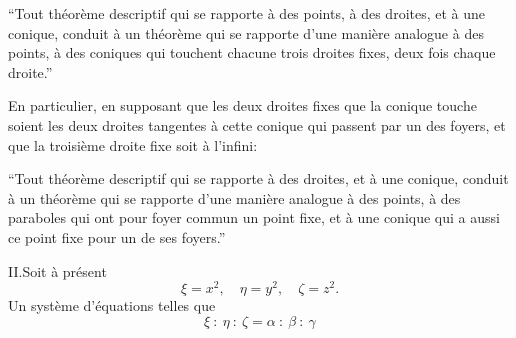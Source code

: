 \documentclass[11pt]{article}
\begin{document}
``Tout th\'eor\`eme descriptif qui se rapporte \`a des points, \`a des droites, et \`a une conique, conduit \`a un th\'eor\`eme qui se rapporte d'une mani\`ere analogue \`a des points, \`a des coniques qui touchent chacune trois droites fixes, deux fois chaque droite.''

En particulier, en supposant que les deux droites fixes que la conique touche soient les deux droites tangentes \`a cette conique qui passent par un des foyers, et que la troisi\`eme droite fixe soit \`a l'infini:

``Tout th\'eor\`eme descriptif qui se rapporte \`a des droites, et \`a une conique, conduit \`a un th\'eor\`eme qui se rapporte d'une mani\`ere analogue \`a des points, \`a des paraboles qui ont pour foyer commun un point fixe, et \`a une conique qui a aussi ce point fixe pour un de ses foyers.''

II.\quad Soit \`a pr\'esent
\[ \xi = x^2,\quad \eta = y^2,\quad \zeta = z^2. \]
Un syst\`eme d'\'equations telles que
\[ \xi\ :\ \eta\ :\ \zeta = \alpha\ :\ \beta\ :\ \gamma \]
\end{document}
